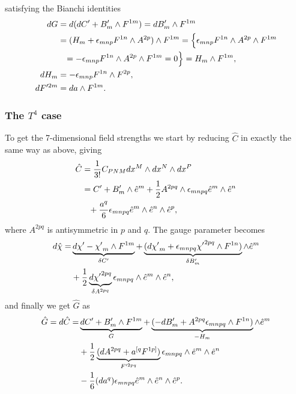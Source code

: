 satisfying the Bianchi identities
\begin{align}
dG &= d(dC' + B_{m}' \wedge F^{1m}) = dB'_m \wedge F^{1m} \nonumber \\
&= (H_m + {\epsilon}_{mnp} F^{1n} \wedge A^{2p}) \wedge F^{1m} = \Big{\{} {\epsilon}_{mnp} F^{1n} \wedge A^{2p} \wedge F^{1m} \nonumber \\
&\phantom{=}= -{\epsilon}_{mnp} F^{1n} \wedge A^{2p} \wedge F^{1m} =0 \Big{\}}= H_m \wedge F^{1m}, \nonumber \\
dH_m &= -{\epsilon}_{mnp} F^{1n} \wedge F^{2p}, \nonumber \\
dF'^{2m} &= da \wedge F^{1m}.
\label{dhf}
\end{align}

\subsubsection{The $T^4$ case}
To get the 7-dimensional field strengths we start by reducing $\hat{C}$ in exactly the same way as above, giving
\begin{align}
\hat{C} &= {1 \over {3!}} C_{PNM}dx^M \wedge dx^N \wedge dx^P \nonumber \\
&= C' + B_{m}' \wedge \hat{e}^m + {1 \over 2}A^{2pq} \wedge {\epsilon}_{mnpq}\hat{e}^m \wedge \hat{e}^n \nonumber \\
&\phantom{=} +{a^q \over 6}{\epsilon}_{mnpq}\hat{e}^m \wedge \hat{e}^n \wedge \hat{e}^p,
\end{align}
where $A^{2pq}$ is antisymmetric in $p$ and $q$. The gauge parameter becomes
\begin{align}
d\hat{\chi}=&\underbrace{d\chi'-{\chi'}_m \wedge F^{1m}}_{\delta C'}+ \underbrace{(d{\chi'}_m + {\epsilon}_{mnpq}{\chi'}^{2pq} \wedge F^{1n})}_{\delta B_{m}'} \wedge \hat{e}^m \nonumber \\
&+{1 \over 2} \underbrace{d{\chi'}^{2pq}}_{\delta A^{2pq}} {\epsilon}_{mnpq} \wedge \hat{e}^m \wedge \hat{e}^n,
\end{align}
and finally we get $\hat{G}$ as
\begin{align}
\hat{G}=d\hat{C}=& \underbrace{dC' + B_{m}' \wedge F^{1m}}_{G} + \underbrace{(-dB_{m}' + A^{2pq} {\epsilon}_{mnpq} \wedge F^{1n})}_{-H_m} \wedge \hat{e}^m \nonumber \\
&+ {1 \over 2} \underbrace{(dA^{2pq} + a^{[q} F^{1p]})}_{F'^{2pq}} {\epsilon}_{mnpq} \wedge \hat{e}^m \wedge \hat{e}^n \nonumber \\
&- {1 \over 6}(da^q){\epsilon}_{mnpq}\hat{e}^m \wedge \hat{e}^n \wedge \hat{e}^p.
\label{fieldsT4}
\end{align}
